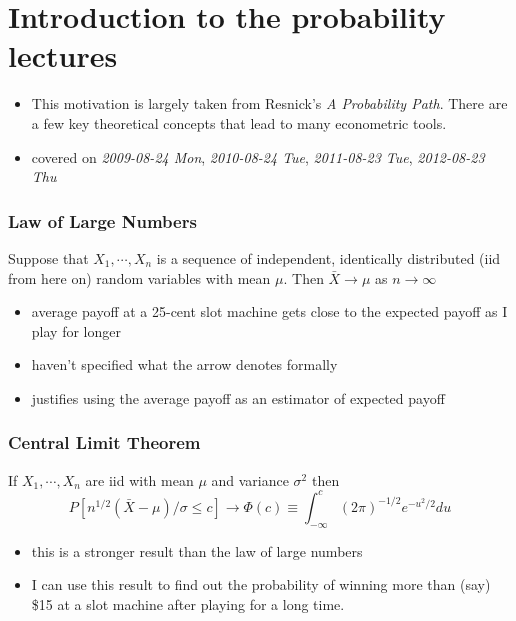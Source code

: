 
\part*{Introduction to the probability lectures}%

\begin{itemize}
\item This motivation is largely taken from Resnick's \emph{A Probability      Path}.  There are a few key theoretical concepts that lead to
     many econometric tools.
\item covered on \textit{2009-08-24 Mon}, \textit{2010-08-24 Tue}, \textit{2011-08-23 Tue},
     \textit{2012-08-23 Thu}
\end{itemize}
\section{Law of Large Numbers}
\label{sec-1}

     Suppose that $X_1,\cdots,X_n$ is a sequence of independent,
     identically distributed (iid from here on) random variables with
     mean $\mu$.  Then $\bar X \to \mu$ as $n \to \infty$
\begin{itemize}
\item average payoff at a 25-cent slot machine gets close to the
       expected payoff as I play for longer
\item haven't specified what the arrow denotes formally
\item justifies using the average payoff as an estimator of expected
       payoff
\end{itemize}
\section{Central Limit Theorem}
\label{sec-2}

     If $X_1,\cdots,X_n$ are iid with mean $\mu$ and variance $\sigma$$^2$
     then
     \[ P[n^{1/2}(\bar X - \mu)/\sigma \leq c] \to \Phi(c)
      \equiv \int_{-\infty}^c (2\pi)^{-1/2} e^{-u^2/2} du
     \]
\begin{itemize}
\item this is a stronger result than the law of large numbers
\item I can use this result to find out the probability of winning more
       than (say) \$15 at a slot machine after playing for a long time.
\end{itemize}

